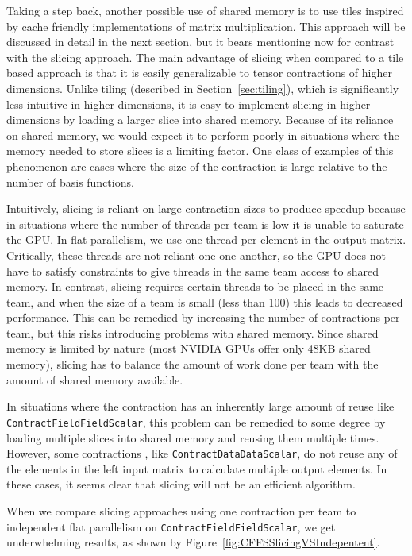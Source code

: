     Taking a step back, another possible use of shared memory is to use tiles inspired
    by cache friendly implementations of matrix multiplication. This approach will be discussed
    in detail in the next section, but it bears mentioning now for contrast with the slicing approach. 
    The main advantage of slicing when compared to a tile based approach is that it is easily generalizable to
tensor contractions of higher dimensions. Unlike tiling (described in Section~\ref{sec:tiling}), which is significantly
less intuitive in higher dimensions, it is easy to implement slicing in higher
dimensions by loading a larger slice into shared memory. Because of its
reliance on shared memory, we would expect it to perform poorly in situations where the memory
needed to store slices is a limiting factor. One class of examples of this phenomenon are cases where the size of the contraction is large relative to the number of basis functions. 

Intuitively, slicing is reliant on large contraction
sizes to produce speedup because in situations where the number of threads per
team is low it is unable to saturate the GPU. In flat parallelism, we use one thread per
element in the output matrix. Critically, these threads are
not reliant one one another, so the GPU does not have to satisfy constraints to 
give threads in the same team access to shared memory. In contrast, slicing requires certain
threads to be placed in the same team, and when the size of a team is small (less than 100)
this leads to decreased performance. 
This can be remedied by increasing the number of contractions per team, but this risks introducing
problems with shared memory. Since shared memory is limited by nature (most NVIDIA GPUs offer only 48KB shared memory), slicing has to balance the amount of work done per team with the amount of shared memory
available.
	
    In situations where the contraction has an inherently large amount of reuse
like \texttt{ContractFieldFieldScalar}, this problem can be remedied to some degree by loading multiple slices into shared memory and reusing them multiple times. However, some 
contractions , like \texttt{ContractDataDataScalar}, do not reuse any of the elements in the left input matrix to
calculate multiple output elements. In these cases, it seems
clear that slicing will not be an efficient algorithm. 
	
When we compare slicing approaches using one contraction per team to
independent flat parallelism on \texttt{ContractFieldFieldScalar}, we get underwhelming
results, as shown by Figure~\ref{fig:CFFSSlicingVSIndepentent}. 

